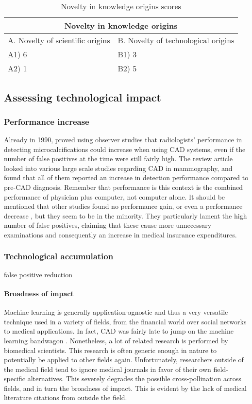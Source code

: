 \begin{table}[h]
\centering
\begin{tabular}{l l}
\hline
\multicolumn{2}{|c|}{Novelty in knowledge origins} \\
\hline
A. Novelty of scientific origins & B. Novelty of technological origins\\
A1) 6 & B1) 3\\ 
A2) 1 & B2) 5\\ 
\hline
\end{tabular}
\caption{Novelty in knowledge origins scores}
\label{tbl:origscores5}
\end{table}

\subsection{Assessing technological impact}
\subsubsection{Performance increase}
Already in 1990, \cite{cadsynergy} proved using observer studies that
radiologists' performance in detecting microcalcifications could increase when
using CAD systems, even if the number of false positives at the time were still
fairly high. The review article \cite{cadhistory} looked into various large
scale studies regarding CAD in mammography, and found that all of them reported
an increase in detection performance compared to pre-CAD diagnosis. Remember
that performance is this context is the combined performance of physician plus
computer, not computer alone. It should be mentioned that other studies found no
performance gain, or even a performance decrease \cite{mammocadbad}, but they
seem to be in the minority. They particularly lament the high number of false
positives, claiming that these cause more unnecessary examinations and
consequently an increase in medical insurance expenditures.

\subsubsection{Technological accumulation}
false positive reduction
\paragraph{Broadness of impact}
Machine learning is generally application-agnostic and thus a very versatile
technique used in a variety of fields, from the financial world over social
networks to medical applications. In fact, CAD was fairly late to jump on the
machine learning bandwagon \cite{mlinmedical}. Nonetheless, a lot of related
research is performed by biomedical scientists. This research is often generic
enough in nature to potentially be applied to other fields again. Unfortunately,
researchers outside of the medical field tend to ignore medical journals in
favor of their own field-specific alternatives. This severely degrades the
possible cross-pollination across fields, and in turn the broadness of impact.
This is evident by the lack of medical literature citations from outside the
field.

